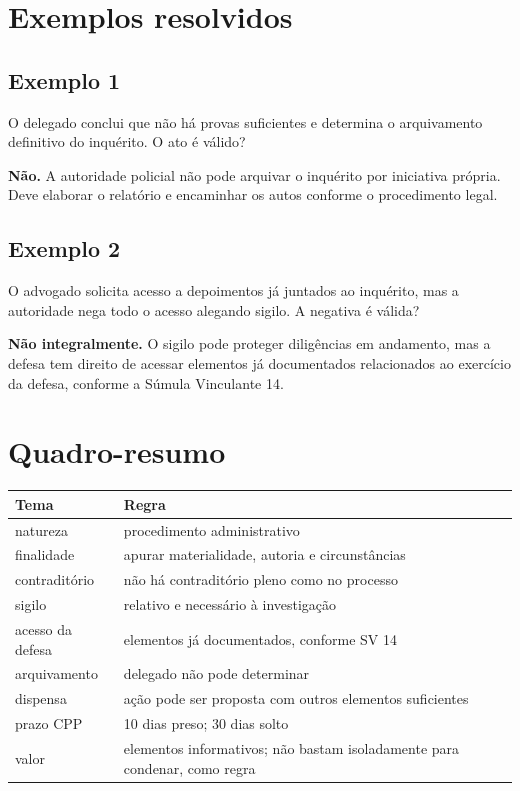 \documentclass[11pt,a4paper]{article}
\begin{document}
\section*{Exemplos resolvidos}

\subsection*{Exemplo 1}

O delegado conclui que não há provas suficientes e determina o arquivamento definitivo do inquérito. O ato é válido?

\textbf{Não.} A autoridade policial não pode arquivar o inquérito por iniciativa própria. Deve elaborar o relatório e encaminhar os autos conforme o procedimento legal.

\subsection*{Exemplo 2}

O advogado solicita acesso a depoimentos já juntados ao inquérito, mas a autoridade nega todo o acesso alegando sigilo. A negativa é válida?

\textbf{Não integralmente.} O sigilo pode proteger diligências em andamento, mas a defesa tem direito de acessar elementos já documentados relacionados ao exercício da defesa, conforme a Súmula Vinculante 14.

\section*{Quadro-resumo}

\begin{tabularx}{\linewidth}{lX}
\toprule
 \textbf{Tema} & \textbf{Regra} \\
\midrule
 natureza & procedimento administrativo \\
 finalidade & apurar materialidade, autoria e circunstâncias \\
 contraditório & não há contraditório pleno como no processo \\
 sigilo & relativo e necessário à investigação \\
 acesso da defesa & elementos já documentados, conforme SV 14 \\
 arquivamento & delegado não pode determinar \\
 dispensa & ação pode ser proposta com outros elementos suficientes \\
 prazo CPP & 10 dias preso; 30 dias solto \\
 valor & elementos informativos; não bastam isoladamente para condenar, como regra \\
\bottomrule
\end{tabularx}
\end{document}
